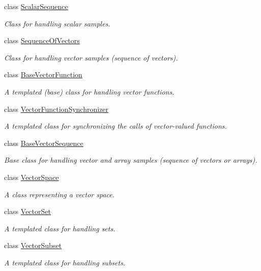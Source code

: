 \begin{DoxyCompactItemize}
class \hyperlink{class_q_u_e_s_o_1_1_scalar_sequence}{Scalar\-Sequence}
\begin{DoxyCompactList}\small\item\em Class for handling scalar samples. \end{DoxyCompactList}\item 
class \hyperlink{class_q_u_e_s_o_1_1_sequence_of_vectors}{Sequence\-Of\-Vectors}
\begin{DoxyCompactList}\small\item\em Class for handling vector samples (sequence of vectors). \end{DoxyCompactList}\item 
class \hyperlink{class_q_u_e_s_o_1_1_base_vector_function}{Base\-Vector\-Function}
\begin{DoxyCompactList}\small\item\em A templated (base) class for handling vector functions. \end{DoxyCompactList}\item 
class \hyperlink{class_q_u_e_s_o_1_1_vector_function_synchronizer}{Vector\-Function\-Synchronizer}
\begin{DoxyCompactList}\small\item\em A templated class for synchronizing the calls of vector-\/valued functions. \end{DoxyCompactList}\item 
class \hyperlink{class_q_u_e_s_o_1_1_base_vector_sequence}{Base\-Vector\-Sequence}
\begin{DoxyCompactList}\small\item\em Base class for handling vector and array samples (sequence of vectors or arrays). \end{DoxyCompactList}\item 
class \hyperlink{class_q_u_e_s_o_1_1_vector_space}{Vector\-Space}
\begin{DoxyCompactList}\small\item\em A class representing a vector space. \end{DoxyCompactList}\item 
class \hyperlink{class_q_u_e_s_o_1_1_vector_set}{Vector\-Set}
\begin{DoxyCompactList}\small\item\em A templated class for handling sets. \end{DoxyCompactList}\item 
class \hyperlink{class_q_u_e_s_o_1_1_vector_subset}{Vector\-Subset}
\begin{DoxyCompactList}\small\item\em A templated class for handling subsets. \end{DoxyCompactList}\item 

\end{DoxyCompactItemize}
